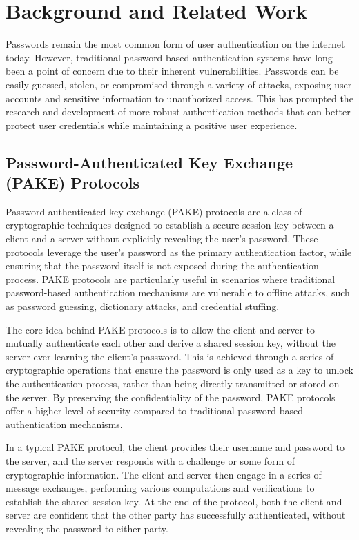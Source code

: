 \section{Background and Related Work}
\label{sec:relwork}

Passwords remain the most common form of user authentication on the internet today. However, traditional password-based authentication systems have long been a point of concern due to their inherent vulnerabilities. Passwords can be easily guessed, stolen, or compromised through a variety of attacks, exposing user accounts and sensitive information to unauthorized access. This has prompted the research and development of more robust authentication methods that can better protect user credentials while maintaining a positive user experience.

\subsection{Password-Authenticated Key Exchange (PAKE) Protocols}
\label{sec:pake}

Password-authenticated key exchange (PAKE) protocols are a class of cryptographic techniques designed to establish a secure session key between a client and a server without explicitly revealing the user's password. These protocols leverage the user's password as the primary authentication factor, while ensuring that the password itself is not exposed during the authentication process. PAKE protocols are particularly useful in scenarios where traditional password-based authentication mechanisms are vulnerable to offline attacks, such as password guessing, dictionary attacks, and credential stuffing.

The core idea behind PAKE protocols is to allow the client and server to mutually authenticate each other and derive a shared session key, without the server ever learning the client's password. This is achieved through a series of cryptographic operations that ensure the password is only used as a key to unlock the authentication process, rather than being directly transmitted or stored on the server. By preserving the confidentiality of the password, PAKE protocols offer a higher level of security compared to traditional password-based authentication mechanisms.

In a typical PAKE protocol, the client provides their username and password to the server, and the server responds with a challenge or some form of cryptographic information. The client and server then engage in a series of message exchanges, performing various computations and verifications to establish the shared session key. At the end of the protocol, both the client and server are confident that the other party has successfully authenticated, without revealing the password to either party.

